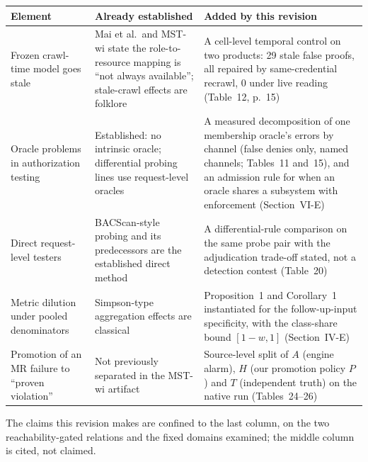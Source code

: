 \documentclass[10pt,letterpaper]{article}
\begin{document}
\begin{center}\small
\begin{tabular}{@{}p{}p{}p{}@{}}
\toprule
\textbf{Element} & \textbf{Already established} & \textbf{Added by this revision} \\
\midrule
Frozen crawl-time model goes stale & Mai et al.\ and MST-wi state the
role-to-resource mapping is ``not always available''; stale-crawl effects are
folklore & A cell-level temporal control on two products: 29 stale false proofs,
all repaired by same-credential recrawl, 0 under live reading
(Table~12, p.~15) \\
Oracle problems in authorization testing & Established: no intrinsic oracle;
differential probing lines use request-level oracles & A measured decomposition
of one membership oracle's errors by channel (false denies only, named
channels; Tables~11 and~15), and an admission rule for when an oracle shares a
subsystem with enforcement (Section~VI-E) \\
Direct request-level testers & BACScan-style probing and its predecessors are
the established direct method & A differential-rule comparison on the same
probe pair with the adjudication trade-off stated, not a detection contest
(Table~20) \\
Metric dilution under pooled denominators & Simpson-type aggregation effects
are classical & Proposition~1 and Corollary~1 instantiated for the
follow-up-input specificity, with the class-share bound $[1-w,1]$
(Section~IV-E) \\
Promotion of an MR failure to ``proven violation'' & Not previously separated
in the MST-wi artifact & Source-level split of $A$ (engine alarm), $H$
(our promotion policy $P$) and $T$ (independent truth) on the native run
(Tables~24--26) \\
\bottomrule
\end{tabular}
\end{center}
\noindent The claims this revision makes are confined to the last column, on the
two reachability-gated relations and the fixed domains examined; the middle
column is cited, not claimed.
\end{document}
